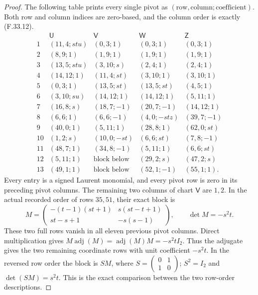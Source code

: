 \begin{proof}
The following table prints every single
pivot as $(\text{row},\text{column};\text{coefficient})$.
Both row and column indices are zero-based,
and the column order is exactly (F.33.12).
\[
\begin{array}{c|c|c|c|c}
 &\mathsf U&\mathsf V&\mathsf W&\mathsf Z\\\hline
1&(11,4;stu)&(0,3;1)&(0,3;1)&(0,3;1)\\
2&(8,9;1)&(1,9;1)&(1,9;1)&(1,9;1)\\
3&(13,5;stu)&(3,10;s)&(2,4;1)&(2,4;1)\\
4&(14,12;1)&(11,4;st)&(3,10;1)&(3,10;1)\\
5&(0,3;1)&(13,5;st)&(13,5;st)&(4,5;1)\\
6&(3,10;su)&(14,12;1)&(14,12;1)&(5,11;1)\\
7&(16,8;s)&(18,7;-1)&(20,7;-1)&(14,12;1)\\
8&(6,6;1)&(6,6;-1)&(4,0;-stz)&(39,7;-1)\\
9&(40,0;1)&(5,11;1)&(28,8;1)&(62,0;st)\\
10&(1,2;s)&(10,0;-st)&(6,6;st)&(7,8;-1)\\
11&(48,7;1)&(34,8;-1)&(5,11;1)&(6,6;st)\\
12&(5,11;1)&\text{block below}&(29,2;s)&(47,2;s)\\
13&(49,1;1)&\text{block below}&(52,1;-1)&(55,1;1).
\end{array}                                                   \tag{F.33.14}
\]
Every entry is a signed Laurent monomial,
and every pivot row is zero in its
preceding pivot columns. The remaining
two columns of chart $\mathsf V$ are
$1,2$. In the actual recorded order
of rows $35,51$, their exact block is
\[
 M=\begin{pmatrix}
 -(t-1)(st+1)&s(st-t+1)\\
 st-s+1&-s(s-1)
 \end{pmatrix},\qquad \det M=-s^2t.
                                                               \tag{F.33.15}
\]
These two full rows vanish in all eleven
previous pivot columns. Direct multiplication
gives $M\operatorname{adj}(M)=
\operatorname{adj}(M)M=-s^2t I_2$.
Thus the adjugate gives the two remaining
coordinate rows with unit coefficient
$-s^2t$. In the reversed row order the
block is $SM$, where
$S=\left(\begin{smallmatrix}0&1\\1&0\end{smallmatrix}\right)$;
$S^2=I_2$ and $\det(SM)=s^2t$.
This is the exact comparison between
the two row-order descriptions.


\end{proof}

